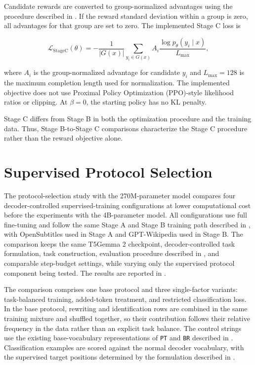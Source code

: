 Candidate rewards are converted to group-normalized advantages using the
procedure described in . If the reward standard deviation
within a group is zero, all advantages for that group are set to zero. The
implemented Stage C loss is

\begin{equation}
\mathcal{L}_{\mathrm{StageC}}(\theta)
=
-\frac{1}{|G(x)|}
\sum_{y_i \in G(x)}
A_i
\frac{\log p_\theta(y_i \mid x)}{L_{\max}},
\end{equation}

where \(A_i\) is the group-normalized advantage for candidate \(y_i\) and
\(L_{\max}=128\) is the maximum completion length used for normalization. The
implemented objective does not use Proximal Policy Optimization (PPO)-style
likelihood ratios or clipping.
At \(\beta=0\), the starting policy has no KL penalty.

Stage C differs from Stage B in both the optimization procedure and the
training data. Thus, Stage B-to-Stage C comparisons characterize the
Stage C procedure rather than the reward objective alone.

\section{Supervised Protocol Selection}
\label{sec:method-ablation-design}

The protocol-selection study with the 270M-parameter model compares four
decoder-controlled supervised-training configurations at lower computational
cost before the experiments with the 4B-parameter model. All configurations use full fine-tuning and follow the same Stage A and Stage
B training path described in , with
OpenSubtitles used in Stage A and GPT-Wikipedia used in Stage B. The
comparison keeps the same T5Gemma 2 checkpoint, decoder-controlled task
formulation, task construction, evaluation procedure described in
, and comparable step-budget settings, while varying only the supervised protocol component
being tested. The results are reported in
.

The comparison comprises one base protocol and three single-factor variants:
task-balanced training, added-token treatment, and restricted classification
loss. In the base protocol, rewriting and identification rows are combined in
the same training mixture and shuffled together, so their contribution follows
their relative frequency in the data rather than an explicit task balance. The
control strings use the existing base-vocabulary representations of
\texttt{PT} and \texttt{BR} described in .
Classification examples are scored against the normal decoder
vocabulary, with the supervised target positions determined by the formulation
described in .


